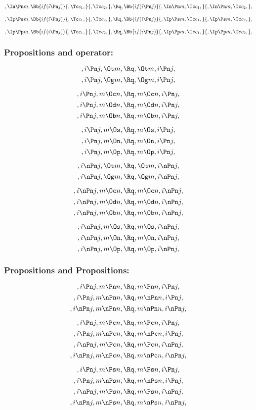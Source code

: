\[,\In \Pn m, \Bb{if(i \Pn j)}{,\Tc c_1,}{,\Tc c_2,}, \Rq , \Bb{if(i \Pn j)}{,\In \Pn m,\Tc c_1,}{,\In \Pn m,\Tc c_2,},\]
\bigskip
\bigskip

\[,\Ip \Ps m, \Bb{if(i \Pn j)}{,\Tc c_1,}{,\Tc c_2,}, \Rq , \Bb{if(i \Pn j)}{,\Ip \Ps m,\Tc c_1,}{,\Ip \Ps m,\Tc c_2,},\]
\bigskip
\bigskip

\[,\Ip \Pp m, \Bb{if(i \Pn j)}{,\Tc c_1,}{,\Tc c_2,}, \Rq , \Bb{if(i \Pn j)}{,\Ip \Pp m,\Tc c_1,}{,\Ip \Pp m,\Tc c_2,},\]
\bigskip
\bigskip



\bigskip
\bigskip
\bigskip
\bigskip
\subsubsection{ Propositions and operator:}
\[, i \Pn j, \Ot m, \Rq , \Ot m, i \Pn j,\]
\[, i \Pn j, \Og m, \Rq , \Og m, i \Pn j,\]

\[, i \Pn j, m \Oc n, \Rq , m \Oc n, i \Pn j,\]
\[, i \Pn j, m \Od n, \Rq , m \Od n, i \Pn j,\]
\[, i \Pn j, m \Ob n, \Rq , m \Ob n, i \Pn j,\]

\[, i \Pn j, m \Os, \Rq , m \Os, i \Pn j,\]
\[, i \Pn j, m \On, \Rq , m \On, i \Pn j,\]
\[, i \Pn j, m \Op, \Rq , m \Op, i \Pn j,\]

\bigskip
\bigskip
\[, i \nPn j, \Ot m, \Rq , \Ot m, i \nPn j,\]
\[, i \nPn j, \Og m, \Rq , \Og m, i \nPn j,\]

\[, i \nPn j, m \Oc n, \Rq , m \Oc n, i \nPn j,\]
\[, i \nPn j, m \Od n, \Rq , m \Od n, i \nPn j,\]
\[, i \nPn j, m \Ob n, \Rq , m \Ob n, i \nPn j,\]

\[, i \nPn j, m \Os, \Rq , m \Os, i \nPn j,\]
\[, i \nPn j, m \On, \Rq , m \On, i \nPn j,\]
\[, i \nPn j, m \Op, \Rq , m \Op, i \nPn j,\]


\bigskip
\bigskip
\bigskip
\bigskip
\subsubsection{ Propositions and Propositions:}
\[,i \Pn j, m \Pn n, \Rq , m \Pn n, i \Pn j,\]
\[,i \Pn j, m \nPn n, \Rq , m \nPn n, i \Pn j,\]
\[,i \nPn j, m \nPn n, \Rq , m \nPn n, i \nPn j,\]

\[,i \Pn j, m \Pc n, \Rq , m \Pc n, i \Pn j,\]
\[,i \Pn j, m \nPc n, \Rq , m \nPc n, i \Pn j,\]
\[,i \nPn j, m \Pc n, \Rq , m \Pc n, i \nPn j,\]
\[,i \nPn j, m \nPc n, \Rq , m \nPc n, i \nPn j,\]

\[,i \Pn j, m \Ps n, \Rq , m \Ps n, i \Pn j,\]
\[,i \Pn j, m \nPs n, \Rq , m \nPs n, i \Pn j,\]
\[,i \nPn j, m \Ps n, \Rq , m \Ps n, i \nPn j,\]
\[,i \nPn j, m \nPs n, \Rq , m \nPs n, i \nPn j,\]


